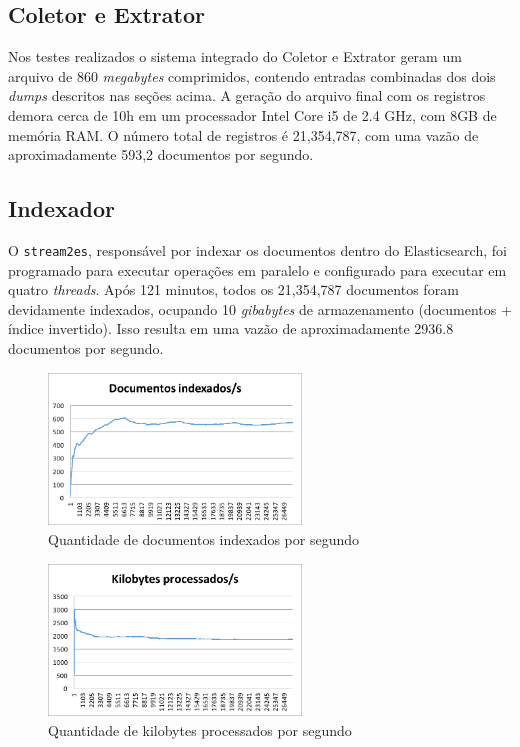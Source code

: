 \documentclass[12pt]{article}
\begin{document}
\subsection{Coletor e Extrator}

Nos testes realizados o sistema integrado do Coletor e Extrator geram um arquivo de 860 \emph{megabytes} comprimidos, contendo entradas combinadas dos dois \emph{dumps} descritos nas seções acima. A geração do arquivo final com os registros demora cerca de 10h em um processador Intel Core i5 de 2.4 GHz, com 8GB de memória RAM. O número total de registros é 21,354,787, com uma vazão de aproximadamente 593,2 documentos por segundo.

\subsection{Indexador}

O \texttt{stream2es}, responsável por indexar os documentos dentro do Elasticsearch, foi programado para executar operações em paralelo e configurado para executar em quatro \emph{threads}. Após 121 minutos, todos os 21,354,787 documentos foram devidamente indexados, ocupando 10 \emph{gibabytes} de armazenamento (documentos + índice invertido). Isso resulta em uma vazão de aproximadamente 2936.8 documentos por segundo.

\begin{figure}
    \centering
    \includegraphics[width=0.6\textwidth]{img/docps}
    \caption{Quantidade de documentos indexados por segundo}
    \label{docs_p_sec}
\end{figure}

\begin{figure}
    \centering
    \includegraphics[width=0.6\textwidth]{img/dataps}
    \caption{Quantidade de kilobytes processados por segundo}
    \label{kb_p_sec}
\end{figure}
\end{document}
